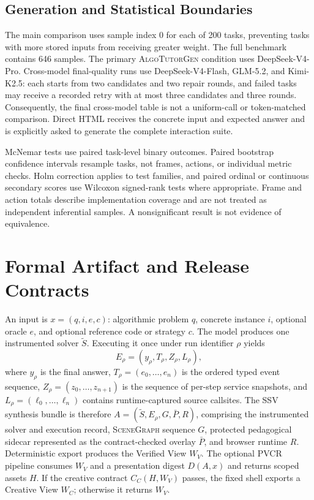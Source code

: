 \documentclass[letterpaper]{article}
\newcommand{\system}{\textsc{AlgoTutorGen}}
\newcommand{\scenegraph}{\textsc{SceneGraph}}
\newcommand{\ssv}{\textsc{SSV}}
\newcommand{\pvcr}{\textsc{PVCR}}
\begin{document}
\subsection{Generation and Statistical Boundaries}

The main comparison uses sample index 0 for each of 200 tasks, preventing tasks with more stored inputs from receiving greater weight. The full benchmark contains 646 samples. The primary \system{} condition uses DeepSeek-V4-Pro. Cross-model final-quality runs use DeepSeek-V4-Flash, GLM-5.2, and Kimi-K2.5: each starts from two candidates and two repair rounds, and failed tasks may receive a recorded retry with at most three candidates and three rounds. Consequently, the final cross-model table is not a uniform-call or token-matched comparison. Direct HTML receives the concrete input and expected answer and is explicitly asked to generate the complete interaction suite.

McNemar tests use paired task-level binary outcomes. Paired bootstrap confidence intervals resample tasks, not frames, actions, or individual metric checks. Holm correction applies to test families, and paired ordinal or continuous secondary scores use Wilcoxon signed-rank tests where appropriate. Frame and action totals describe implementation coverage and are not treated as independent inferential samples. A nonsignificant result is not evidence of equivalence.

\section{Formal Artifact and Release Contracts}

An input is $x=(q,i,e,c)$: algorithmic problem $q$, concrete instance $i$, optional oracle $e$, and optional reference code or strategy $c$. The model produces one instrumented solver $\widetilde S$. Executing it once under run identifier $\rho$ yields
\[
E_\rho=(y_\rho,T_\rho,Z_\rho,L_\rho),
\]
where $y_\rho$ is the final answer, $T_\rho=(e_0,\ldots,e_n)$ is the ordered typed event sequence, $Z_\rho=(z_0,\ldots,z_{n+1})$ is the sequence of per-step service snapshots, and $L_\rho=(\ell_0,\ldots,\ell_n)$ contains runtime-captured source callsites. The \ssv{} synthesis bundle is therefore $A=(\widetilde S,E_\rho,G,\bar P,R)$, comprising the instrumented solver and execution record, \scenegraph{} sequence $G$, protected pedagogical sidecar represented as the contract-checked overlay $\bar P$, and browser runtime $R$. Deterministic export produces the Verified View $W_V$. The optional \pvcr{} pipeline consumes $W_V$ and a presentation digest $D(A,x)$ and returns scoped assets $H$. If the creative contract $C_C(H,W_V)$ passes, the fixed shell exports a Creative View $W_C$; otherwise it returns $W_V$.
\end{document}
